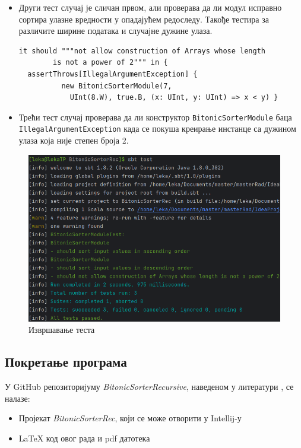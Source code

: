 \documentclass[12pt, a4paper]{article}
\theoremstyle{definition}
\begin{document}
\begin{enumerate}
\begin{itemize}
  \item Други тест случај је сличан првом, али проверава да ли модул исправно сортира улазне вредности у опадајућем редоследу. Такође тестира за различите ширине података и случајне дужине улаза.
  \begin{verbatim}
it should """not allow construction of Arrays whose length
        is not a power of 2""" in {
  assertThrows[IllegalArgumentException] {
          new BitonicSorterModule(7,
            UInt(8.W), true.B, (x: UInt, y: UInt) => x < y) }
  \end{verbatim}

  \item Трећи тест случај проверава да ли конструктор \verb+BitonicSorterModule+ баца \verb+IllegalArgumentException+ када се покуша креирање инстанце са дужином улаза која није степен броја 2.
 \end{itemize}
\end{enumerate}


\begin{figure}[H]
  \centering
      \includegraphics[scale=0.5]{slike/testRes2}
  \caption{Извршавање теста}
  \label{fig:testRes}
\end{figure}

\newpage
\subsection{Покретање програма}
У GitHub репозиториjуму \textit{BitonicSorterRecursive}, наведеном у литератури \cite{git_moje}, се налазе:
\begin{itemize}
\item Пројекат \textit{BitonicSorterRec}, који се може отворити у Intellij-у
\item \LaTeX{} код овог рада и pdf датотека
\end{itemize}
\end{document}
